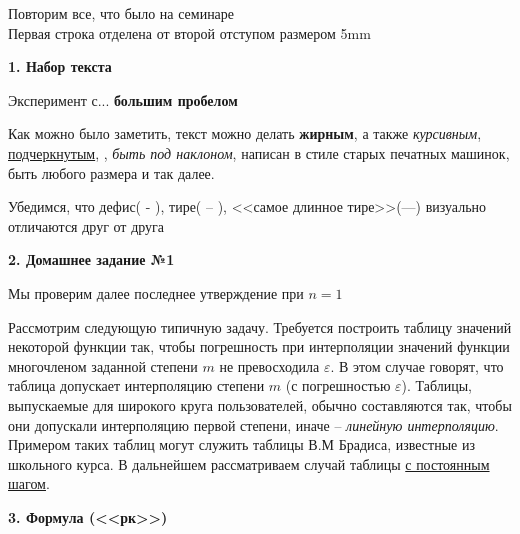 \documentclass{article}
\begin{document}
 
    \begin{center}
        \LARGE{Повторим все, что было на семинаре}
        \\[5mm]
        \normalsize{Первая строка отделена от второй отступом размером 5mm}
    \end{center}

    \vspace{1cm}

    \textbf{1. Набор текста} 

    Эксперимент с... \hspace{5mm} \textbf{большим пробелом}
 
    Как можно было заметить, текст можно делать \textbf{жирным}, а также \textit{курсивным}, \underline{подчеркнутым}, , {\slshape быть под наклоном}, {\ttfamily написан в стиле старых печатных машинок}, {\large быть любого размера} и так далее.

    Убедимся, что дефис( - ), тире( -- ), <<самое длинное тире>>(---) визуально отличаются друг от друга

    \vspace{1cm}

    \textbf{2. Домашнее задание №\hspace{0.5mm}1}

    \sloppypar

    Мы проверим далее последнее утверждение при $n = 1$

    Рассмотрим следующую типичную задачу. Требуется построить таблицу значений некоторой функции так, чтобы погрешность при интерполяции значений функции многочленом заданной степени $m$ не превосходила $\varepsilon$. В этом случае говорят, что таблица допускает интерполяцию степени $m$ (с погрешностью $\varepsilon$). Таблицы, выпускаемые для
    широкого круга пользователей, обычно составляются так, чтобы они допускали интерполяцию первой степени, иначе -- \textsl{линейную интерполяцию}. Примером таких таблиц могут служить таблицы В.М Брадиса, известные из школьного курса. В дальнейшем рассматриваем случай таблицы \underline{с постоянным шагом}.
    
    \vspace{1cm}

    \textbf{3. Формула (<<рк>>)}
\end{document}

